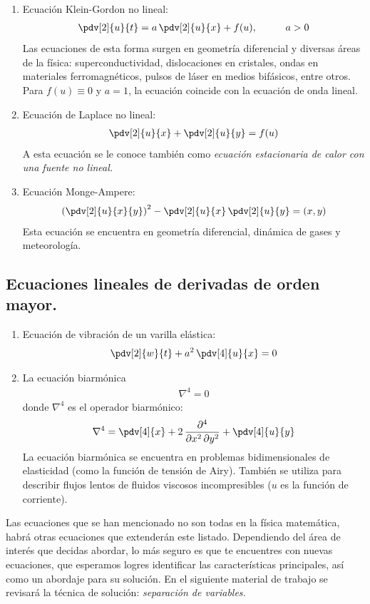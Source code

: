\begin{enumerate}
\item Ecuación Klein-Gordon no lineal:
\begin{align}
\pdv[2]{u}{t} = a \, \pdv[2]{u}{x} + f(u),\hspace{1cm} a > 0
\label{eq:ecuacion_S31}
\end{align}
Las ecuaciones de esta forma surgen en geometría diferencial y diversas áreas de la física: superconductividad, dislocaciones en cristales, ondas en materiales ferromagnéticos, pulsos de láser en medios bifásicos, entre otros. Para $f (u) \equiv 0$ y $a = 1$, la ecuación coincide con la ecuación de onda lineal.
\item Ecuación de Laplace no lineal:
\begin{align}
\pdv[2]{u}{x} + \pdv[2]{u}{y} = f(u)
\label{eq:ecuacion_S32}
\end{align}
A esta ecuación se le conoce también como \emph{ecuación estacionaria de calor con una fuente no lineal.}
\item Ecuación Monge-Ampere:
\begin{align}
\left( \pdv[2]{u}{x}{y} \right)^{2} - \pdv[2]{u}{x} \, \pdv[2]{u}{y} = (x, y)
\label{eq:ecuacion_S33}
\end{align}
Esta ecuación se encuentra en geometría diferencial, dinámica de gases y meteorología.
\end{enumerate}

\subsection{Ecuaciones lineales de derivadas de orden mayor.}

\begin{enumerate}
\item Ecuación de vibración de un varilla elástica:
\begin{align*}
\pdv[2]{w}{t} + a^{2} \, \pdv[4]{u}{x} = 0
\end{align*}
\item La ecuación biarmónica
\begin{align*}
\nabla^{4} = 0
\end{align*}
donde $\nabla^{4}$ es el operador biarmónico:
\begin{align*}
\nabla^{4} = \pdv[4]{x} + 2 \, \dfrac{\partial^{4}}{\partial x^{2} \, \partial y^{2}} + \pdv[4]{u}{y}
\end{align*}
La ecuación biarmónica se encuentra en problemas bidimensionales de elasticidad (como la función de tensión de Airy). También se utiliza para describir flujos lentos de fluidos viscosos incompresibles ($u$ es la función de corriente).
\end{enumerate}
Las ecuaciones que se han mencionado no son todas en la física matemática, habrá otras ecuaciones que extenderán este listado. Dependiendo del área de interés que decidas abordar, lo más seguro es que te encuentres con nuevas ecuaciones, que esperamos logres identificar las características principales, así como un abordaje para su solución. En el siguiente material de trabajo se revisará la técnica de solución: \emph{separación de variables.}


